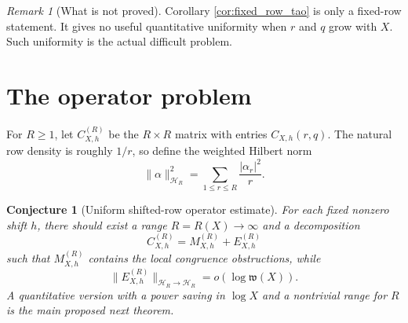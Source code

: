 \documentclass[11pt]{amsart}
\numberwithin{equation}{section}
\theoremstyle{plain}
\newtheorem{conjecture}[theorem]{Conjecture}
\theoremstyle{definition}
\theoremstyle{remark}
\newtheorem{remark}[theorem]{Remark}
\begin{document}
\begin{remark}[What is not proved]
\label{rem:fixed_not_uniform}
Corollary \ref{cor:fixed_row_tao} is only a fixed-row statement.  It gives no useful quantitative uniformity when \(r\) and \(q\) grow with \(X\).  Such uniformity is the actual difficult problem.
\end{remark}

\section{The operator problem}
\label{sec:operator_problem}

For \(R\ge1\), let \(C_{X,h}^{(R)}\) be the \(R\times R\) matrix with entries \(C_{X,h}(r,q)\).  The natural row density is roughly \(1/r\), so define the weighted Hilbert norm
\begin{equation}
\|\alpha\|_{\mathcal H_R}^2=\sum_{1\le r\le R}\frac{|\alpha_r|^2}{r}.
\label{eq:H_norm_def}
\end{equation}

\begin{conjecture}[Uniform shifted-row operator estimate]
\label{conj:operator_estimate}
For each fixed nonzero shift \(h\), there should exist a range \(R=R(X)\to\infty\) and a decomposition
\begin{equation}
C_{X,h}^{(R)}=M_{X,h}^{(R)}+E_{X,h}^{(R)}
\label{eq:operator_decomposition}
\end{equation}
such that \(M_{X,h}^{(R)}\) contains the local congruence obstructions, while
\begin{equation}
\|E_{X,h}^{(R)}\|_{\mathcal H_R\to\mathcal H_R}=o(\log\mathfrak w(X)).
\label{eq:operator_error_conjecture}
\end{equation}
A quantitative version with a power saving in \(\log X\) and a nontrivial range for \(R\) is the main proposed next theorem.
\end{conjecture}
\end{document}
